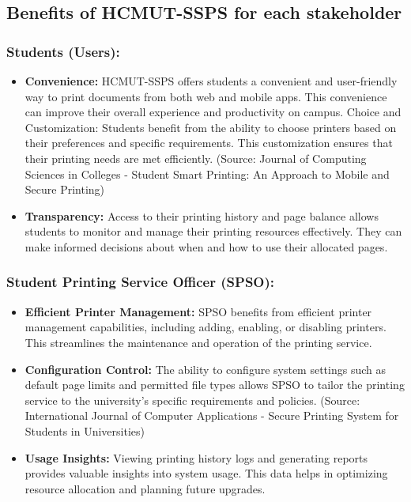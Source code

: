 \subsection{Benefits of HCMUT-SSPS for each stakeholder}

\subsubsection{Students (Users):}
\begin{itemize}
\item \textbf{Convenience:} HCMUT-SSPS offers students a convenient and user-friendly way to print documents from both web and mobile apps. This convenience can improve their overall experience and productivity on campus.
Choice and Customization: Students benefit from the ability to choose printers based on their preferences and specific requirements. This customization ensures that their printing needs are met efficiently. (Source: Journal of Computing Sciences in Colleges - Student Smart Printing: An Approach to Mobile and Secure Printing)
\item \textbf{Transparency:} Access to their printing history and page balance allows students to monitor and manage their printing resources effectively. They can make informed decisions about when and how to use their allocated pages.
\end{itemize}
\subsubsection{Student Printing Service Officer (SPSO):}
\begin{itemize}
\item \textbf{Efficient Printer Management:} SPSO benefits from efficient printer management capabilities, including adding, enabling, or disabling printers. This streamlines the maintenance and operation of the printing service.
\item \textbf{Configuration Control:} The ability to configure system settings such as default page limits and permitted file types allows SPSO to tailor the printing service to the university's specific requirements and policies. (Source: International Journal of Computer Applications - Secure Printing System for Students in Universities)
\item \textbf{Usage Insights:} Viewing printing history logs and generating reports provides valuable insights into system usage. This data helps in optimizing resource allocation and planning future upgrades.

\end{itemize}
